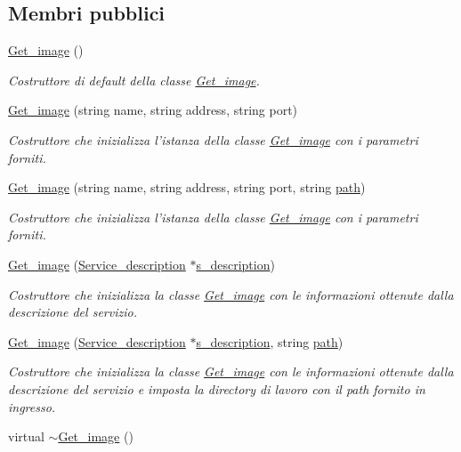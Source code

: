 \subsection*{Membri pubblici}
\begin{DoxyCompactItemize}
\item 
\hyperlink{class_get__image_a5517f5f85b538ebb63431448140a788a}{Get\-\_\-image} ()
\begin{DoxyCompactList}\small\item\em Costruttore di default della classe \hyperlink{class_get__image}{Get\-\_\-image}. \end{DoxyCompactList}\item 
\hyperlink{class_get__image_a1baaf0f15469480c90ed2c90a6a8b0dc}{Get\-\_\-image} (string name, string address, string port)
\begin{DoxyCompactList}\small\item\em Costruttore che inizializza l'istanza della classe \hyperlink{class_get__image}{Get\-\_\-image} con i parametri forniti. \end{DoxyCompactList}\item 
\hyperlink{class_get__image_a1e55c68de9f17dce123cb5bf1f6a9c6b}{Get\-\_\-image} (string name, string address, string port, string \hyperlink{class_get__image_a5a2f7a3384d879568383e61151f2bf11}{path})
\begin{DoxyCompactList}\small\item\em Costruttore che inizializza l'istanza della classe \hyperlink{class_get__image}{Get\-\_\-image} con i parametri forniti. \end{DoxyCompactList}\item 
\hyperlink{class_get__image_af742c8d21028f545c2d03afe3a468501}{Get\-\_\-image} (\hyperlink{struct_service__description}{Service\-\_\-description} $\ast$\hyperlink{class_service_a55e991ff18c0dceca202388a771283dc}{s\-\_\-description})
\begin{DoxyCompactList}\small\item\em Costruttore che inizializza la classe \hyperlink{class_get__image}{Get\-\_\-image} con le informazioni ottenute dalla descrizione del servizio. \end{DoxyCompactList}\item 
\hyperlink{class_get__image_ae1ca342b78c3df79faef72321c5728fa}{Get\-\_\-image} (\hyperlink{struct_service__description}{Service\-\_\-description} $\ast$\hyperlink{class_service_a55e991ff18c0dceca202388a771283dc}{s\-\_\-description}, string \hyperlink{class_get__image_a5a2f7a3384d879568383e61151f2bf11}{path})
\begin{DoxyCompactList}\small\item\em Costruttore che inizializza la classe \hyperlink{class_get__image}{Get\-\_\-image} con le informazioni ottenute dalla descrizione del servizio e imposta la directory di lavoro con il path fornito in ingresso. \end{DoxyCompactList}\item 
\hypertarget{class_get__image_a51a6a5acc16df05b182da40729e90cde}{virtual \hyperlink{class_get__image_a51a6a5acc16df05b182da40729e90cde}{$\sim$\-Get\-\_\-image} ()}\label{class_get__image_a51a6a5acc16df05b182da40729e90cde}


\end{DoxyCompactItemize}
